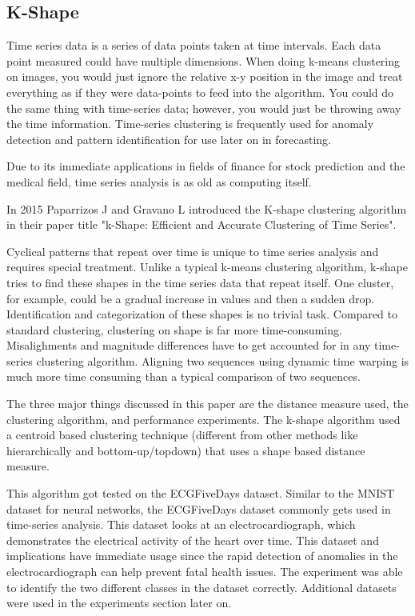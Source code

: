 \documentclass[12pt]{apa6}
\begin{document}
\subsection{K-Shape}


Time series data is a series of data points taken at time intervals. Each data point measured could have multiple dimensions. When doing k-means clustering on images, you would just ignore the relative x-y position in the image and treat everything as if they were data-points to feed into the algorithm. You could do the same thing with time-series data; however, you would just be throwing away the time information. Time-series clustering is frequently used for anomaly detection and pattern identification for use later on in forecasting. 


Due to its immediate applications in fields of finance for stock prediction and the medical field, time series analysis is as old as computing itself.  


In 2015 Paparrizos J and Gravano L introduced the K-shape clustering algorithm in their paper title "k-Shape: Efficient and Accurate Clustering of Time Series"\cite{k-shape}. 

Cyclical patterns that repeat over time is unique to time series analysis and requires special treatment. Unlike a typical k-means clustering algorithm, k-shape tries to find these shapes in the time series data that repeat itself. One cluster, for example, could be a gradual increase in values and then a sudden drop. Identification and categorization of these shapes is no trivial task. Compared to standard clustering, clustering on shape is far more time-consuming. Misalighments and magnitude differences have to get accounted for in any time-series clustering algorithm. Aligning two sequences using dynamic time warping is much more time consuming than a typical comparison of two sequences.


The three major things discussed in this paper are the distance measure used, the clustering algorithm, and performance experiments. The k-shape algorithm used a centroid based clustering technique (different from other methods like hierarchically and bottom-up/topdown) that uses a shape based distance measure. 


This algorithm got tested on the ECGFiveDays dataset. Similar to the MNIST dataset for neural networks, the ECGFiveDays dataset commonly gets used in time-series analysis. This dataset looks at an electrocardiograph, which demonstrates the electrical activity of the heart over time. This dataset and implications have immediate usage since the rapid detection of anomalies in the electrocardiograph can help prevent fatal health issues. The experiment was able to identify the two different classes in the dataset correctly. Additional datasets were used in the experiments section later on. 
\end{document}
